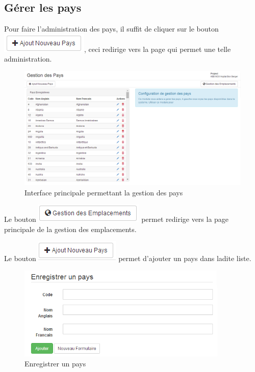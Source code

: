 \documentclass[12pt,a4paper]{report}
\begin{document}
\subsection{Gérer les pays}
Pour faire l'administration des pays, il suffit de cliquer sur le bouton \includegraphics[scale=0.7]{pic/AddNewCountry.png}, ceci redirige vers la page qui permet une telle administration.
\begin{figure}[h]
\begin{center}
\includegraphics[width=14cm]{pic/AdminCountry.png}
\end{center}
\caption{Interface principale permettant la gestion des pays}
\label{Interface principale permettant la gestion des pays}
\end{figure}

Le bouton \includegraphics[scale=0.7]{pic/GestionEmplacement.png}  permet redirige vers la page principale de la gestion des emplacements.

Le bouton \includegraphics[scale=0.7]{pic/AddCountry.png} permet d'ajouter un pays dans ladite liste.

\begin{figure}[h]
\begin{center}
\includegraphics[width=10cm]{pic/SaveCountry.png}
\end{center}
\caption{Enregistrer un pays}
\label{Enregistrer un pays}
\end{figure}
\end{document}
